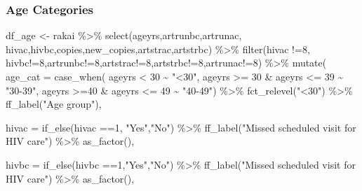 \documentclass[
  letterpaper,
  DIV=11,
  numbers=noendperiod]{scrartcl}
\newenvironment{Shaded}{\begin{snugshade}}{\end{snugshade}}
\newcommand{\AttributeTok}[1]{\textcolor[rgb]{0.40,0.45,0.13}{#1}}
\newcommand{\DecValTok}[1]{\textcolor[rgb]{0.68,0.00,0.00}{#1}}
\newcommand{\FunctionTok}[1]{\textcolor[rgb]{0.28,0.35,0.67}{#1}}
\newcommand{\NormalTok}[1]{\textcolor[rgb]{0.00,0.23,0.31}{#1}}
\newcommand{\OtherTok}[1]{\textcolor[rgb]{0.00,0.23,0.31}{#1}}
\newcommand{\SpecialCharTok}[1]{\textcolor[rgb]{0.37,0.37,0.37}{#1}}
\newcommand{\StringTok}[1]{\textcolor[rgb]{0.13,0.47,0.30}{#1}}
\begin{document}
\subsubsection{Age Categories}\label{age-categories}

\begin{Shaded}
\begin{Highlighting}[]
\NormalTok{df\_age }\OtherTok{\textless{}{-}}\NormalTok{  rakai }\SpecialCharTok{\%\textgreater{}\%} 
  \FunctionTok{select}\NormalTok{(ageyrs,artrunbc,artrunac,}
\NormalTok{         hivac,hivbc,copies,new\_copies,artstrac,artstrbc) }\SpecialCharTok{\%\textgreater{}\%} 
  \FunctionTok{filter}\NormalTok{(hivac }\SpecialCharTok{!=}\DecValTok{8}\NormalTok{, hivbc}\SpecialCharTok{!=}\DecValTok{8}\NormalTok{,artrunbc}\SpecialCharTok{!=}\DecValTok{8}\NormalTok{,artstrac}\SpecialCharTok{!=}\DecValTok{8}\NormalTok{,artstrbc}\SpecialCharTok{!=}\DecValTok{8}\NormalTok{,artrunac}\SpecialCharTok{!=}\DecValTok{8}\NormalTok{) }\SpecialCharTok{\%\textgreater{}\%} 
  \FunctionTok{mutate}\NormalTok{(}
     \AttributeTok{age\_cat =} \FunctionTok{case\_when}\NormalTok{(}
\NormalTok{                             ageyrs }\SpecialCharTok{\textless{}} \DecValTok{30} \SpecialCharTok{\textasciitilde{}} \StringTok{"\textless{}30"}\NormalTok{,}
\NormalTok{                             ageyrs }\SpecialCharTok{\textgreater{}=} \DecValTok{30} \SpecialCharTok{\&}\NormalTok{ ageyrs }\SpecialCharTok{\textless{}=} \DecValTok{39} \SpecialCharTok{\textasciitilde{}}  \StringTok{"30{-}39"}\NormalTok{,}
\NormalTok{                             ageyrs }\SpecialCharTok{\textgreater{}=}\DecValTok{40} \SpecialCharTok{\&}\NormalTok{ ageyrs }\SpecialCharTok{\textless{}=} \DecValTok{49} \SpecialCharTok{\textasciitilde{}} \StringTok{"40{-}49"}\NormalTok{) }\SpecialCharTok{\%\textgreater{}\%} 
           \FunctionTok{fct\_relevel}\NormalTok{(}\StringTok{"\textless{}30"}\NormalTok{) }\SpecialCharTok{\%\textgreater{}\%} 
           \FunctionTok{ff\_label}\NormalTok{(}\StringTok{"Age group"}\NormalTok{),}
  
    \AttributeTok{hivac =} \FunctionTok{if\_else}\NormalTok{(hivac }\SpecialCharTok{==}\DecValTok{1}\NormalTok{, }\StringTok{"Yes"}\NormalTok{,}\StringTok{"No"}\NormalTok{) }\SpecialCharTok{\%\textgreater{}\%} 
    \FunctionTok{ff\_label}\NormalTok{(}\StringTok{"Missed scheduled visit for HIV care"}\NormalTok{) }\SpecialCharTok{\%\textgreater{}\%} 
      \FunctionTok{as\_factor}\NormalTok{(),}
   
     \AttributeTok{hivbc =} \FunctionTok{if\_else}\NormalTok{(hivbc }\SpecialCharTok{==}\DecValTok{1}\NormalTok{,}\StringTok{"Yes"}\NormalTok{,}\StringTok{"No"}\NormalTok{) }\SpecialCharTok{\%\textgreater{}\%} 
    \FunctionTok{ff\_label}\NormalTok{(}\StringTok{"Missed scheduled visit for HIV care"}\NormalTok{) }\SpecialCharTok{\%\textgreater{}\%} 
    \FunctionTok{as\_factor}\NormalTok{(),}
 

\end{Highlighting}
\end{Shaded}
\end{document}
